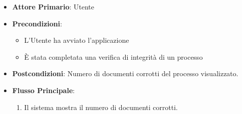 \begin{itemize}
    \item \textbf{Attore Primario}: Utente
    \item \textbf{Precondizioni}:
        \begin{itemize}
            \item L'Utente ha avviato l'applicazione
            \item È stata completata una verifica di integrità di un processo
            
        \end{itemize} 
    \item \textbf{Postcondizioni}: Numero di documenti corrotti del processo visualizzato.     
    \item \textbf{Flusso Principale}:
        \begin{enumerate}
            \item Il sistema mostra il numero di documenti corrotti.
        \end{enumerate}
\end{itemize}

